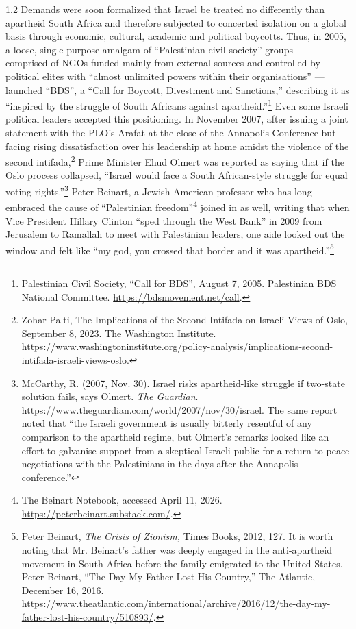 \documentclass[../unravbook.tex]{subfiles}
\begin{document}
\begin{spacing}{1.2}
Demands were soon formalized that Israel be treated no differently than apartheid South Africa and therefore subjected to concerted isolation on a global basis through economic, cultural, academic and political boycotts. Thus, in 2005, a loose, single-purpose amalgam of ``Palestinian civil society'' groups --- comprised of NGOs funded mainly from external sources and controlled by political elites with ``almost unlimited powers within their organisations'' \parencite[5]{Shafi-2004}  --- launched \enquote{BDS}, a \enquote{Call for Boycott, Divestment and Sanctions,} describing it as \enquote{inspired by the struggle of South Africans against apartheid.}\footnote{Palestinian Civil Society, \enquote{Call for BDS}, August 7, 2005. Palestinian BDS National Committee. \url{https://bdsmovement.net/call}.} Even some Israeli political leaders accepted this positioning. In November 2007, after issuing a joint statement with the PLO's Arafat at the close of the Annapolis Conference but facing rising dissatisfaction over his leadership at home amidst the violence of the second intifada,\footnote{Zohar Palti, {The Implications of the Second Intifada on Israeli Views of Oslo,} September 8, 2023. The Washington Institute. \url{https://www.washingtoninstitute.org/policy-analysis/implications-second-intifada-israeli-views-oslo}.} Prime Minister Ehud Olmert was reported as saying that if the Oslo process collapsed, ``Israel would face a South African-style struggle for equal voting rights.''\footnote{McCarthy, R. (2007, Nov. 30). Israel risks apartheid-like struggle if two-state solution fails, says Olmert. \textit{The Guardian}. \url{https://www.theguardian.com/world/2007/nov/30/israel}. The same report noted that \enquote{the Israeli government is usually bitterly resentful of any comparison to the apartheid regime, but Olmert's remarks looked like an effort to galvanise support from a skeptical Israeli public for a return to peace negotiations with the Palestinians in the days after the Annapolis conference.}} Peter Beinart, a Jewish-American professor who has long embraced the cause of \enquote{Palestinian freedom}\footnote{The Beinart Notebook, accessed April 11, 2026. \url{https://peterbeinart.substack.com/}.} joined in as well, writing that when Vice President Hillary Clinton \enquote{sped through the West Bank} in 2009 from Jerusalem to Ramallah to meet with Palestinian leaders, one aide looked out the window and felt like \enquote{my god, you crossed that border and it was apartheid.}\footnote{Peter Beinart, \textit{The Crisis of Zionism,} Times Books, 2012, 127. It is worth noting that Mr. Beinart's father was deeply engaged in the anti-apartheid movement in South Africa before the family emigrated to the United States. Peter Beinart, \enquote{The Day My Father Lost His Country,} The Atlantic, December 16, 2016. \url{https://www.theatlantic.com/international/archive/2016/12/the-day-my-father-lost-his-country/510893/}.}


\end{spacing}
\end{document}

